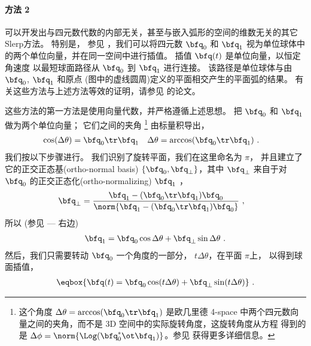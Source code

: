 \paragraph{方法 2}
可以开发出与四元数代数的内部无关，甚至与嵌入弧形的空间的维数无关的其它Slerp方法。 
特别是， 参见 ，我们可以将四元数 $\bfq_0$ 和 $\bfq_1$ 视为单位球体中的两个单位向量，并在同一空间中进行插值。 
插值 $\bfq(t)$ 是单位向量，以恒定角速度
以最短球面路径从 $\bfq_0$ 到 $\bfq_1$ 进行连接。
该路径是单位球体与由 $\bfq_0$, $\bfq_1$ 和原点 (图中的虚线圆周)定义的平面相交产生的平面弧的结果。
有关这些方法与上述方法等效的证明，请参见 \cite{DAM-1998} 的论文。

这些方法的第一方法是使用向量代数，并严格遵循上述思想。 
把 $\bfq_0$ 和 $\bfq_1$ 做为两个单位向量；
%
它们之间的夹角%
\footnote{这个角度 $\Delta\theta=\arccos(\bfq_0\tr\bfq_1)$ 是欧几里德 4-space 中两个四元数向量之间的夹角，而不是 3D 空间中的实际旋转角度，这旋转角度从方程  得到的是 $\Delta\phi=\norm{\Log(\bfq_0^*\ot\bfq_1)}$。参见  获得更多详细信息。}
由标量积导出，
%
\begin{align}\label{equ:slerp_angle}
\cos(\Delta\theta)&=\bfq_0\tr\bfq_1 & \Delta\theta&=\arccos(\bfq_0\tr\bfq_1)
~.
\end{align}
%
我们按以下步骤进行。 
我们识别了旋转平面，我们在这里命名为 $\pi$，
并且建立了它的正交正态基(ortho-normal basis) $\{\bfq_0,\bfq_\bot\}$，其中 $\bfq_\bot$ 来自于对 $\bfq_0$ 的正交正态化(ortho-normalizing) $\bfq_1$ ，
%
\begin{align}
\bfq_\bot &= \frac{\bfq_1-(\bfq_0\tr\bfq_1)\bfq_0}{\norm{\bfq_1-(\bfq_0\tr\bfq_1)\bfq_0}}
~,
\end{align}
%
所以 (参见  --- 右边)
%
\begin{align} \label{equ:q1}
\bfq_1 = \bfq_0 \cos \Delta\theta + \bfq_\bot \sin \Delta\theta
~.
\end{align}
%
然后，我们只需要转动 $\bfq_0$ 一个角度的一部分， $t\Delta\theta$，在平面 $\pi$上，
以得到球面插值，
%
\begin{align}\label{equ:slerp_rot}
\eqbox{
\bfq(t) = \bfq_0 \cos(t\Delta\theta) + \bfq_\bot\sin(t\Delta\theta)
}
~.
\end{align}


